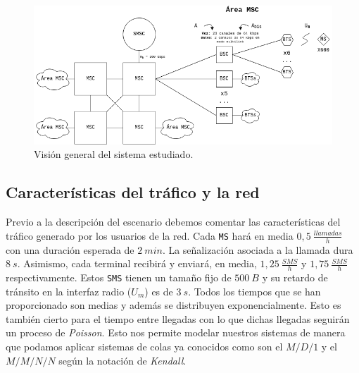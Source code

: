 \documentclass[10pt]{article}
\begin{document}


			\begin{figure}
				\centering
				\includegraphics[width=1\linewidth]{GSM_system.png}
				\caption{Visión general del sistema estudiado.}
				\label{f:general_sys}
			\end{figure}

		\subsection{Características del tráfico y la red}
			Previo a la descripción del escenario debemos comentar las características del tráfico generado por los usuarios de la red. Cada \texttt{MS} hará en media $0,5\ \frac{llamadas}{h}$ con una duración esperada de $2\ min$. La señalización asociada a la llamada dura $8\ s$. Asimismo, cada terminal recibirá y enviará, en media, $1,25\ \frac{SMS}{h}$ y $1,75\ \frac{SMS}{h}$ respectivamente. Estos \texttt{SMS} tienen un tamaño fijo de $500\ B$ y su retardo de tránsito en la interfaz radio ($U_m$) es de $3\ s$. Todos los tiempos que se han proporcionado son medias y además se distribuyen exponencialmente. Esto es también cierto para el tiempo entre llegadas con lo que dichas llegadas seguirán un proceso de \textit{Poisson}. Esto nos permite modelar nuestros sistemas de manera que podamos aplicar sistemas de colas ya conocidos como son el $M/D/1$ y el $M/M/N/N$ según la notación de \textit{Kendall}.
\end{document}
